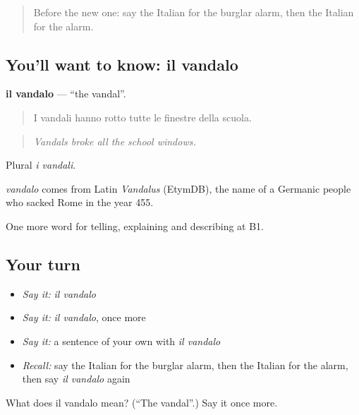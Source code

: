 \label{lesson:IT-C293-vandalo}



\begin{quote}
Before the new one: say the Italian for the burglar alarm, then the Italian for the alarm.
\end{quote}

\subsection*{You'll want to know: il vandalo}
\textbf{il vandalo} — \textquotedblleft{}the vandal\textquotedblright{}.

\begin{quote}
I vandali hanno rotto tutte le finestre della scuola.
\end{quote}

\begin{quote}
\emph{Vandals broke all the school windows.}
\end{quote}

Plural \emph{i vandali}.

\begin{cousinweb}
\emph{vandalo} comes from Latin \emph{Vandalus} (EtymDB), the name of a Germanic people who sacked Rome in the year 455.
\end{cousinweb}

\begin{grammarlens}[title={What you've built}]
One more word for telling, explaining and describing at B1.
\end{grammarlens}

\subsection*{Your turn}
\begin{itemize}
\raggedright
  \item \emph{Say it:} \emph{il vandalo}
  \item \emph{Say it:} \emph{il vandalo}, once more
  \item \emph{Say it:} a sentence of your own with \emph{il vandalo}
  \item \emph{Recall:} say the Italian for the burglar alarm, then the Italian for the alarm, then say \emph{il vandalo} again
\end{itemize}

\begin{tcolorbox}[breakable,colback=teal!4,colframe=teal!35!black,title={Before you move on}]
What does il vandalo mean? (\textquotedblleft{}The vandal\textquotedblright{}.) Say it once more.
\end{tcolorbox}
